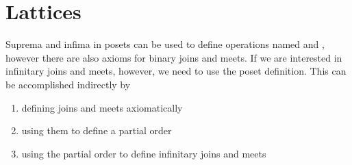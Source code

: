\section{Lattices}\label{sec:lattices}

\begin{note}\label{note:infinite_join_meet}
  Suprema and infima in posets can be used to define operations named  and , however there are also axioms for binary joins and meets. If we are interested in infinitary joins and meets, however, we need to use the poset definition. This can be accomplished indirectly by
  \begin{enumerate}
    \item defining joins and meets axiomatically
    \item using them to define a partial order
    \item using the partial order to define infinitary joins and meets
  \end{enumerate}
\end{note}

